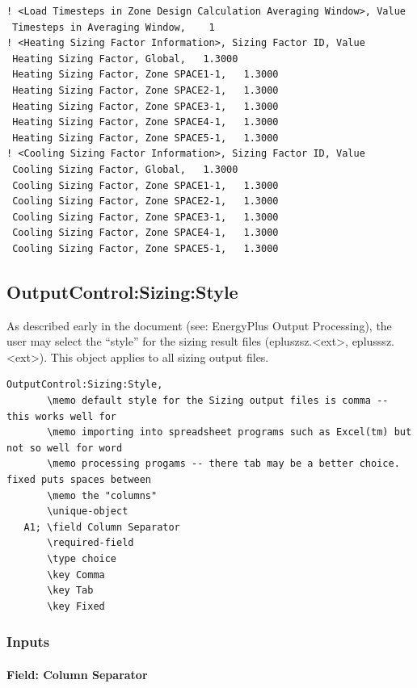 \begin{lstlisting}
! <Load Timesteps in Zone Design Calculation Averaging Window>, Value
 Timesteps in Averaging Window,    1
! <Heating Sizing Factor Information>, Sizing Factor ID, Value
 Heating Sizing Factor, Global,   1.3000
 Heating Sizing Factor, Zone SPACE1-1,   1.3000
 Heating Sizing Factor, Zone SPACE2-1,   1.3000
 Heating Sizing Factor, Zone SPACE3-1,   1.3000
 Heating Sizing Factor, Zone SPACE4-1,   1.3000
 Heating Sizing Factor, Zone SPACE5-1,   1.3000
! <Cooling Sizing Factor Information>, Sizing Factor ID, Value
 Cooling Sizing Factor, Global,   1.3000
 Cooling Sizing Factor, Zone SPACE1-1,   1.3000
 Cooling Sizing Factor, Zone SPACE2-1,   1.3000
 Cooling Sizing Factor, Zone SPACE3-1,   1.3000
 Cooling Sizing Factor, Zone SPACE4-1,   1.3000
 Cooling Sizing Factor, Zone SPACE5-1,   1.3000
\end{lstlisting}

\subsection{OutputControl:Sizing:Style}\label{outputcontrolsizingstyle}

As described early in the document (see: EnergyPlus Output Processing), the user may select the ``style'' for the sizing result files (epluszsz.\textless{}ext\textgreater{}, eplusssz.\textless{}ext\textgreater{}). This object applies to all sizing output files.

\begin{lstlisting}
OutputControl:Sizing:Style,
       \memo default style for the Sizing output files is comma -- this works well for
       \memo importing into spreadsheet programs such as Excel(tm) but not so well for word
       \memo processing progams -- there tab may be a better choice.  fixed puts spaces between
       \memo the "columns"
       \unique-object
   A1; \field Column Separator
       \required-field
       \type choice
       \key Comma
       \key Tab
       \key Fixed
\end{lstlisting}

\subsubsection{Inputs}\label{inputs-3-009}

\paragraph{Field: Column Separator}\label{field-column-separator-000}


